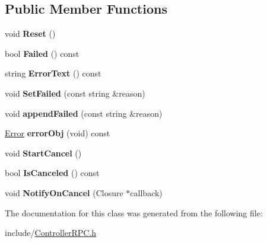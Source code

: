 \subsection*{Public Member Functions}
\begin{DoxyCompactItemize}
\item 
\mbox{\label{classcoappbrpc_1_1ControllerRPC_aac8d7a0e52a017d60a411a462bad6d91}} 
void {\bfseries Reset} ()
\item 
\mbox{\label{classcoappbrpc_1_1ControllerRPC_a20a3b119687bea2ac836db07a3b04287}} 
bool {\bfseries Failed} () const
\item 
\mbox{\label{classcoappbrpc_1_1ControllerRPC_a96035415234221d2972a3f2f790275ce}} 
string {\bfseries Error\+Text} () const
\item 
\mbox{\label{classcoappbrpc_1_1ControllerRPC_a3d91a6d0ba16232c531c3313e4412212}} 
void {\bfseries Set\+Failed} (const string \&reason)
\item 
\mbox{\label{classcoappbrpc_1_1ControllerRPC_a480586532b344e3ca8da2d2519ba593f}} 
void {\bfseries append\+Failed} (const string \&reason)
\item 
\mbox{\label{classcoappbrpc_1_1ControllerRPC_aab955bb22c799e5d544b3083fe64c7d7}} 
\hyperlink{classcoappbrpc_1_1Error}{Error} {\bfseries error\+Obj} (void) const
\item 
\mbox{\label{classcoappbrpc_1_1ControllerRPC_a48a78ccc3c70a2135c78d612154e077c}} 
void {\bfseries Start\+Cancel} ()
\item 
\mbox{\label{classcoappbrpc_1_1ControllerRPC_ab6458ec248edf24fcc83b12a2573e13f}} 
bool {\bfseries Is\+Canceled} () const
\item 
\mbox{\label{classcoappbrpc_1_1ControllerRPC_abc9385d7476171035cffb779c7966f89}} 
void {\bfseries Notify\+On\+Cancel} (Closure $\ast$callback)
\end{DoxyCompactItemize}


The documentation for this class was generated from the following file\+:\begin{DoxyCompactItemize}
\item 
include/\hyperlink{ControllerRPC_8h}{Controller\+R\+P\+C.\+h}\end{DoxyCompactItemize}
